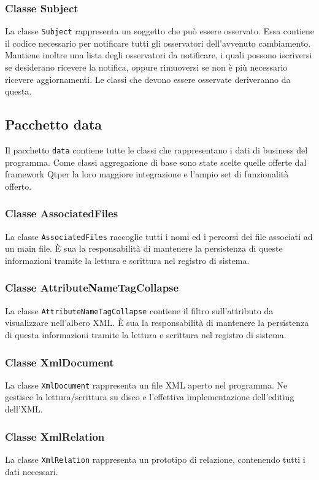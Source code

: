 	\subsubsection{Classe Subject}
		La classe \texttt{Subject} rappresenta un soggetto che può essere osservato. Essa contiene il codice necessario per notificare tutti gli osservatori dell'avvenuto cambiamento. Mantiene inoltre una lista degli osservatori da notificare, i quali possono iscriversi se desiderano ricevere la notifica, oppure rimuoversi se non è più necessario ricevere aggiornamenti. Le classi che devono essere osservate deriveranno da questa.

\subsection{Pacchetto data}
	Il pacchetto \texttt{data} contiene tutte le classi che rappresentano i dati di business del programma. Come classi aggregazione di base sono state scelte quelle offerte dal framework Qt\textregistered per la loro maggiore integrazione e l'ampio set di funzionalità offerto.

	\subsubsection{Classe AssociatedFiles}
		La classe \texttt{AssociatedFiles} raccoglie tutti i nomi ed i percorsi dei file associati ad un main file. È sua la responsabilità di mantenere la persistenza di queste informazioni tramite la lettura e scrittura nel registro di sistema.
	
	\subsubsection{Classe AttributeNameTagCollapse}
		La classe \texttt{AttributeNameTagCollapse} contiene il filtro sull'attributo da visualizzare nell'albero XML. È sua la responsabilità di mantenere la persistenza di questa informazioni tramite la lettura e scrittura nel registro di sistema.
		
	\subsubsection{Classe XmlDocument}
		La classe \texttt{XmlDocument} rappresenta un file XML aperto nel programma. Ne gestisce la lettura/scrittura su disco e l'effettiva implementazione dell'editing dell'XML.

	\subsubsection{Classe XmlRelation}
		La classe \texttt{XmlRelation} rappresenta un prototipo di relazione, contenendo tutti i dati necessari.
		
